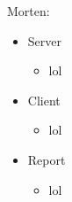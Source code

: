 Morten: 
\begin{itemize}
	\item Server
	\begin{itemize}
		\item lol
	\end{itemize}
	\item Client
	\begin{itemize}
		\item lol
	\end{itemize}
	\item Report
	\begin{itemize}
		\item lol
	\end{itemize}
\end{itemize}